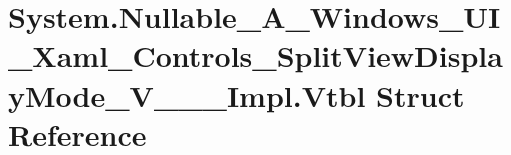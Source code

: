\hypertarget{struct_system_1_1_nullable___a___windows___u_i___xaml___controls___split_view_display_mode___v_______impl_1_1_vtbl}{}\section{System.\+Nullable\+\_\+\+A\+\_\+\+Windows\+\_\+\+U\+I\+\_\+\+Xaml\+\_\+\+Controls\+\_\+\+Split\+View\+Display\+Mode\+\_\+\+V\+\_\+\+\_\+\+\_\+\+Impl.\+Vtbl Struct Reference}
\label{struct_system_1_1_nullable___a___windows___u_i___xaml___controls___split_view_display_mode___v_______impl_1_1_vtbl}
